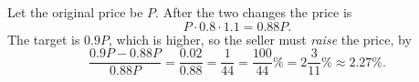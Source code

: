 Let the original price be $P$. After the two changes the price is
\[
P\cdot0.8\cdot1.1=0.88P .
\]
The target is $0.9P$, which is higher, so the seller must \emph{raise} the price, by
\[
\dfrac{0.9P-0.88P}{0.88P}=\dfrac{0.02}{0.88}=\dfrac{1}{44}=\dfrac{100}{44}\%=\boxed{2\dfrac{3}{11}\%}\approx2.27\% .
\]
